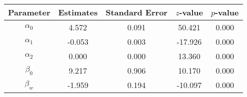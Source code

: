 \begin{table}[ht]
\centering
\begin{tabular}{ccccc}
  \hline
Parameter & Estimates & Standard Error & $z$-value & $p$-value \\ 
  \hline
$\alpha_0$ & 4.572 & 0.091 & 50.421 & 0.000 \\ 
  $\alpha_1$ & -0.053 & 0.003 & -17.926 & 0.000 \\ 
  $\alpha_2$ & 0.000 & 0.000 & 13.360 & 0.000 \\ 
  $\beta_0$ & 9.217 & 0.906 & 10.170 & 0.000 \\ 
  $\beta_w$ & -1.959 & 0.194 & -10.097 & 0.000 \\ 
   \hline
\end{tabular}
\end{table}
